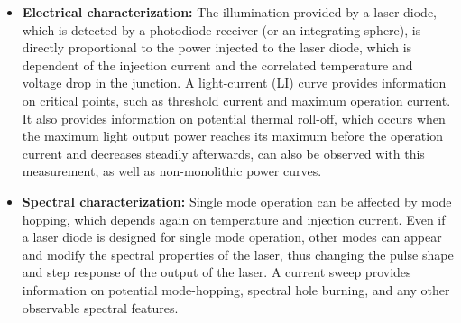 \begin{itemize}
\item \textbf{Electrical characterization:} The illumination provided by a laser diode, which is detected by a photodiode receiver (or an integrating sphere), is directly proportional to the power injected to the laser diode, which is dependent of the injection current and the correlated temperature and voltage drop in the junction. A light-current (LI) curve provides information on critical points, such as threshold current and maximum operation current. It also provides information on potential thermal roll-off, which occurs when the maximum light output power reaches its maximum before the operation current and decreases steadily afterwards, can also be observed with this measurement, as well as non-monolithic power curves. 
\item \textbf{Spectral characterization:} Single mode operation can be affected by mode hopping, which depends again on temperature and injection current. Even if a laser diode is designed for single mode operation, other modes can appear and modify the spectral properties of the laser, thus changing the pulse shape and step response of the output of the laser. A current sweep provides information on potential mode-hopping, spectral hole burning, and any other observable spectral features.
\end{itemize}


